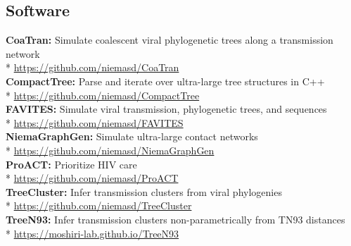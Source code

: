 \documentclass[margin,line]{res}
\begin{document}
\begin{resume}
\section{\sc Software}
\textbf{CoaTran:} Simulate coalescent viral phylogenetic trees along a transmission network\\*\vspace{2mm}
\hspace*{4mm} \href{https://github.com/niemasd/CoaTran}{https://github.com/niemasd/CoaTran}\\
\textbf{CompactTree:} Parse and iterate over ultra-large tree structures in C++\\*\vspace{2mm}
\hspace*{4mm} \href{https://github.com/niemasd/CompactTree}{https://github.com/niemasd/CompactTree}\\
\textbf{FAVITES:} Simulate viral transmission, phylogenetic trees, and sequences\\*\vspace{2mm}
\hspace*{4mm} \href{https://github.com/niemasd/FAVITES}{https://github.com/niemasd/FAVITES}\\
\textbf{NiemaGraphGen:} Simulate ultra-large contact networks\\*\vspace{2mm}
\hspace*{4mm} \href{https://github.com/niemasd/NiemaGraphGen}{https://github.com/niemasd/NiemaGraphGen}\\
\textbf{ProACT:} Prioritize HIV care\\*\vspace{2mm}
\hspace*{4mm} \href{https://github.com/niemasd/ProACT}{https://github.com/niemasd/ProACT}\\
\textbf{TreeCluster:} Infer transmission clusters from viral phylogenies\\*\vspace{2mm}
\hspace*{4mm} \href{https://github.com/niemasd/TreeCluster}{https://github.com/niemasd/TreeCluster}\\
\textbf{TreeN93:} Infer transmission clusters non-parametrically from TN93 distances\\*\vspace{2mm}
\hspace*{4mm} \href{https://moshiri-lab.github.io/TreeN93}{https://moshiri-lab.github.io/TreeN93}\\

\end{resume}
\end{document}

